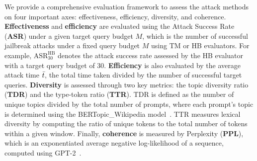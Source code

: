  We provide a comprehensive evaluation framework to assess the attack methods on four important axes: effectiveness, efficiency, diversity, and coherence. \textbf{Effectiveness} and \textbf{efficiency} are evaluated using the Attack Success Rate (\textbf{ASR}) under a given target query budget $M$, which is the number of successful jailbreak attacks under a fixed query budget $M$ using TM or HB evaluators. For example, $\text{ASR}_{30}^{\text{HB}}$ denotes the attack success rate assessed by the HB evaluator with a target query budget of 30. \textbf{Efficiency} is also evaluated by the average attack time $\Bar{t}$, the total time taken divided by the number of successful target queries.  \textbf{Diversity} is assessed through two key metrics: the topic diversity ratio (\textbf{TDR}) and the type-token ratio (\textbf{TTR}). TDR is defined as the number of unique topics divided by the total number of prompts, where each prompt’s topic is determined using the BERTopic\_Wikipedia model~\citep{grootendorst_bertopic_2022}. TTR measures lexical diversity by computing the ratio of unique tokens to the total number of tokens within a given window. Finally, \textbf{coherence} is measured by Perplexity (\textbf{PPL}), which is an exponentiated average negative log-likelihood of a sequence, computed using GPT-2~\citep{radford_language_nodate}.




